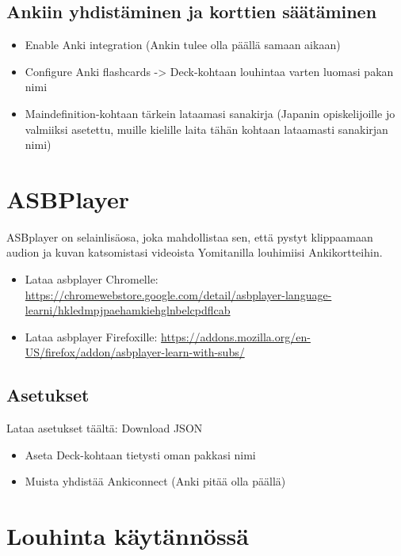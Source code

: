 \documentclass[
]{book}
\providecommand{\tightlist}{%
  \setlength{\itemsep}{0pt}\setlength{\parskip}{0pt}}
\begin{document}
\section{Ankiin yhdistäminen ja korttien säätäminen}\label{Ankiin-yhdistaminen-ja-korttien-saataminen}

\begin{itemize}
\item
  Enable Anki integration (Ankin tulee olla päällä samaan aikaan)
\item
  Configure Anki flashcards -\textgreater{} Deck-kohtaan louhintaa varten luomasi pakan nimi
\item
  Maindefinition-kohtaan tärkein lataamasi sanakirja (Japanin opiskelijoille jo valmiiksi asetettu, muille kielille laita tähän kohtaan lataamasti sanakirjan nimi)
\end{itemize}

\chapter{ASBPlayer}\label{asbplayer}

ASBplayer on selainlisäosa, joka mahdollistaa sen, että pystyt klippaamaan audion ja kuvan katsomistasi videoista Yomitanilla louhimiisi Ankikortteihin.

\begin{itemize}
\tightlist
\item
  Lataa asbplayer Chromelle: \url{https://chromewebstore.google.com/detail/asbplayer-language-learni/hkledmpjpaehamkiehglnbelcpdflcab}
\item
  Lataa asbplayer Firefoxille: \url{https://addons.mozilla.org/en-US/firefox/addon/asbplayer-learn-with-subs/}
\end{itemize}

\section{Asetukset}\label{asetukset-1}

Lataa asetukset täältä: Download JSON

\begin{itemize}
\item
  Aseta Deck-kohtaan tietysti oman pakkasi nimi
\item
  Muista yhdistää Ankiconnect (Anki pitää olla päällä)
\end{itemize}

\chapter{Louhinta käytännössä}\label{Louhinta-kaytannossa}
\end{document}
